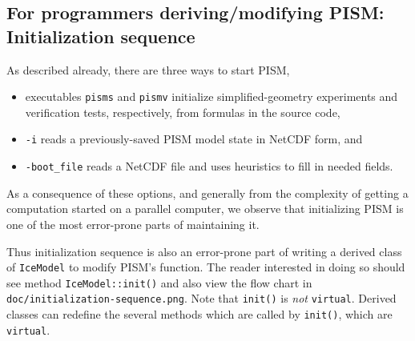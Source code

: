 \documentclass[titlepage,letterpaper,final]{scrartcl}
\begin{document}
\subsection{For programmers deriving/modifying PISM:  Initialization sequence}  As described already, there are three ways to start PISM,\begin{itemize}
\item executables \texttt{pisms} and \texttt{pismv} initialize simplified-geometry experiments and verification tests, respectively, from formulas in the source code,
\item \texttt{-i} reads a previously-saved PISM model state in NetCDF form, and
\item \texttt{-boot_file} reads a NetCDF file and uses heuristics to fill in needed fields.
\end{itemize}
As a consequence of these options, and generally from the complexity of getting a computation started on a parallel computer, we observe that initializing PISM is one of the most error-prone parts of maintaining it.

Thus initialization sequence is also an error-prone part of writing a derived class of \texttt{IceModel} to modify PISM's function.  The reader interested in doing so should see method \texttt{IceModel::init()} and also view the flow chart in \texttt{doc/initialization-sequence.png}.  Note that \texttt{init()} is \emph{not} \texttt{virtual}.  Derived classes can redefine the several methods which are called by \texttt{init()}, which are \texttt{virtual}.


\clearpage\newpage


\clearpage\newpage


\clearpage\newpage


\clearpage\newpage


\clearpage\newpage


\clearpage\newpage


\clearpage\newpage


\clearpage\newpage


\clearpage\newpage



{}
\label{sect:index}
\printindex

{}
\printindex[options]
\end{document}
